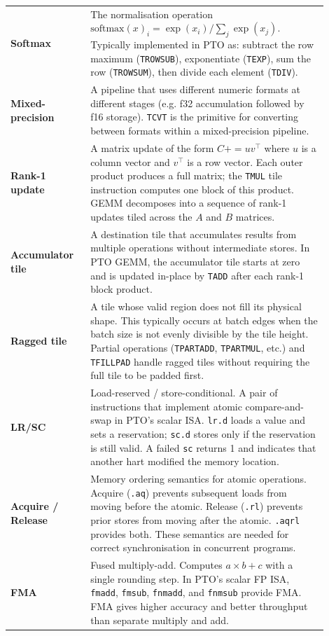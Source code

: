 \begin{longtable}{@{}L{0.22\linewidth}L{0.68\linewidth}@{}}
\textbf{Softmax} & The normalisation operation $\mathrm{softmax}(x)_i = \exp(x_i) / \sum_j \exp(x_j)$. Typically implemented in PTO as: subtract the row maximum (\texttt{TROWSUB}), exponentiate (\texttt{TEXP}), sum the row (\texttt{TROWSUM}), then divide each element (\texttt{TDIV}). \\
\textbf{Mixed-precision} & A pipeline that uses different numeric formats at different stages (e.g. f32 accumulation followed by f16 storage). \texttt{TCVT} is the primitive for converting between formats within a mixed-precision pipeline. \\
\textbf{Rank-1 update} & A matrix update of the form $C += u v^\top$ where $u$ is a column vector and $v^\top$ is a row vector. Each outer product produces a full matrix; the \texttt{TMUL} tile instruction computes one block of this product. GEMM decomposes into a sequence of rank-1 updates tiled across the $A$ and $B$ matrices. \\
\textbf{Accumulator tile} & A destination tile that accumulates results from multiple operations without intermediate stores. In PTO GEMM, the accumulator tile starts at zero and is updated in-place by \texttt{TADD} after each rank-1 block product. \\
\textbf{Ragged tile} & A tile whose valid region does not fill its physical shape. This typically occurs at batch edges when the batch size is not evenly divisible by the tile height. Partial operations (\texttt{TPARTADD}, \texttt{TPARTMUL}, etc.) and \texttt{TFILLPAD} handle ragged tiles without requiring the full tile to be padded first. \\
\textbf{LR/SC} & Load-reserved / store-conditional. A pair of instructions that implement atomic compare-and-swap in PTO's scalar ISA. \texttt{lr.d} loads a value and sets a reservation; \texttt{sc.d} stores only if the reservation is still valid. A failed \texttt{sc} returns 1 and indicates that another hart modified the memory location. \\
\textbf{Acquire / Release} & Memory ordering semantics for atomic operations. Acquire (\texttt{.aq}) prevents subsequent loads from moving before the atomic. Release (\texttt{.rl}) prevents prior stores from moving after the atomic. \texttt{.aqrl} provides both. These semantics are needed for correct synchronisation in concurrent programs. \\
\textbf{FMA} & Fused multiply-add. Computes $a \times b + c$ with a single rounding step. In PTO's scalar FP ISA, \texttt{fmadd}, \texttt{fmsub}, \texttt{fnmadd}, and \texttt{fnmsub} provide FMA. FMA gives higher accuracy and better throughput than separate multiply and add. \\

\end{longtable}
